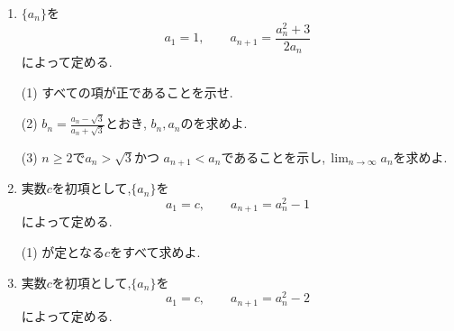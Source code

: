 \begin{enumerate}[label=\textbf{問\arabic*.},leftmargin=3.8em,format=\bookitemlink{practice-special}{problem}{answer}]
                (1) の候補を求め,すべての段階で分母が$\displaystyle 0$にならず,
                が定義できることを示せ.
                \par\smallskip\noindent
                (2) 周期の最小値を求めよ.
          \item {}$\displaystyle \{a_n\}$を
                \[
                  a_1=1,\qquad
                  a_{n+1}=\frac{a_n^2+3}{2a_n}
                \]
                によって定める.
                \par\smallskip\noindent
                (1) すべての項が正であることを示せ.
                \par\smallskip\noindent
                (2) $\displaystyle b_n=\frac{a_n-\sqrt3}{a_n+\sqrt3}$とおき,
                $\displaystyle b_n,a_n$のを求めよ.
                \par\smallskip\noindent
                (3) $\displaystyle n\ge2$で$\displaystyle a_n>\sqrt3$かつ
                $\displaystyle a_{n+1}<a_n$であることを示し,\,$\displaystyle \lim_{n\to\infty}a_n$を求めよ.
          \item 実数$\displaystyle c$を初項として,$\displaystyle \{a_n\}$を
                \[
                  a_1=c,\qquad a_{n+1}=a_n^2-1
                \]
                によって定める.
                \par\smallskip\noindent
                (1) が定となる$\displaystyle c$をすべて求めよ.
                \par\smallskip\noindent
          \item 実数$\displaystyle c$を初項として,$\displaystyle \{a_n\}$を
                \[
                  a_1=c,\qquad a_{n+1}=a_n^2-2
                \]
                によって定める.
                \par\smallskip\noindent

\end{enumerate}
